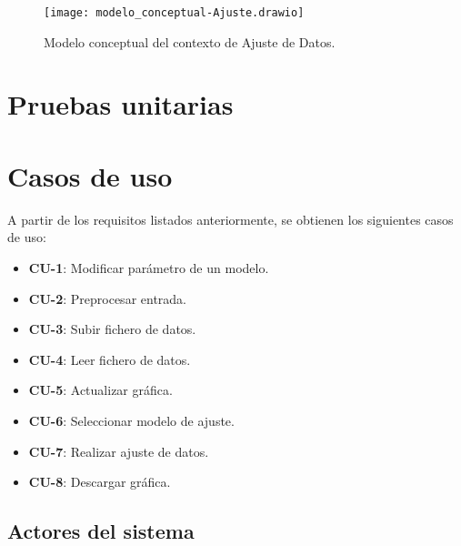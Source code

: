 \begin{figure}[!h]
\begin{center}
\caption{Modelo conceptual del contexto de Ajuste de Datos.}
\label{diag: modelo_concep_ajuste}
\texttt{[image: modelo\_conceptual-Ajuste.drawio]}
\end{center}
\end{figure}







\section{Pruebas unitarias}



\section{Casos de uso}

A partir de los requisitos listados anteriormente, se obtienen los siguientes casos de uso:

\begin{itemize}
\item \textbf{CU-1}: Modificar parámetro de un modelo.
\item \textbf{CU-2}: Preprocesar entrada.
\item \textbf{CU-3}: Subir fichero de datos.
\item \textbf{CU-4}: Leer fichero de datos.
\item \textbf{CU-5}: Actualizar gráfica.
\item \textbf{CU-6}: Seleccionar modelo de ajuste.
\item \textbf{CU-7}: Realizar ajuste de datos.
\item \textbf{CU-8}: Descargar gráfica.
\end{itemize}

\subsection{Actores del sistema}


